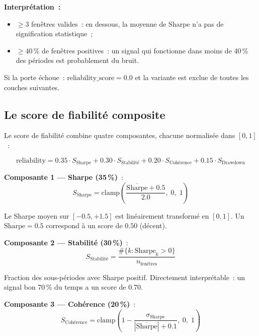 \textbf{Interprétation~:}
\begin{itemize}
    \item $\geq 3$ fenêtres valides~: en dessous, la moyenne de Sharpe n'a pas de
    signification statistique~;
    \item $\geq 40\,\%$ de fenêtres positives~: un signal qui fonctionne dans moins
    de 40\,\% des périodes est probablement du bruit.
\end{itemize}

Si la porte échoue~: $\text{reliability\_score} = 0.0$ et la variante est exclue
de toutes les couches suivantes.

\subsection{Le score de fiabilité composite}

Le score de fiabilité combine quatre composantes, chacune normalisée dans $[0, 1]$~:

\begin{equation}
\text{reliability} = 0.35 \cdot S_{\text{Sharpe}}
                   + 0.30 \cdot S_{\text{Stabilité}}
                   + 0.20 \cdot S_{\text{Cohérence}}
                   + 0.15 \cdot S_{\text{Drawdown}}
\label{eq:reliability}
\end{equation}

\textbf{Composante 1 — Sharpe (35\,\%)}~:
\begin{equation}
S_{\text{Sharpe}} = \text{clamp}\!\left(\frac{\overline{\text{Sharpe}} + 0.5}{2.0},\; 0,\; 1\right)
\label{eq:sharpe_score}
\end{equation}

Le Sharpe moyen sur $[-0.5, +1.5]$ est linéairement transformé en $[0, 1]$.
Un $\overline{\text{Sharpe}} = 0.5$ correspond à un score de $0.50$ (décent).

\textbf{Composante 2 — Stabilité (30\,\%)}~:
\begin{equation}
S_{\text{Stabilité}} = \frac{\#\{k : \text{Sharpe}_k > 0\}}{n_{\text{fenêtres}}}
\label{eq:stability_score}
\end{equation}

Fraction des sous-périodes avec Sharpe positif. Directement interprétable~:
un signal \og bon \fg{} 70\,\% du temps a un score de 0.70.

\textbf{Composante 3 — Cohérence (20\,\%)}~:
\begin{equation}
S_{\text{Cohérence}} = \text{clamp}\!\left(1 - \frac{\sigma_{\text{Sharpe}}}{|\overline{\text{Sharpe}}| + 0.1},\; 0,\; 1\right)
\label{eq:consistency_score}
\end{equation}

